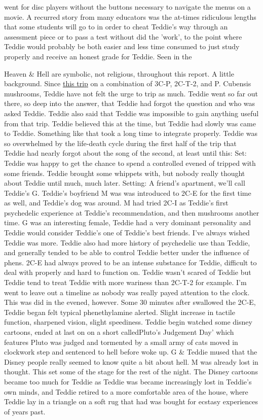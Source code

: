 \documentclass[12pt]{book}
\begin{document}
went for disc players without the buttons necessary to navigate the menus on a movie. A recurred story from many educators was the at-times ridiculous lengths that some students will go to in order to cheat Teddie's way through an assessment piece or to pass a test without did the 'work', to the point where Teddie would probably be both easier and less time consumed to just study properly and receive an honest grade for Teddie. Seen in the



Heaven \& Hell are symbolic, not religious, throughout this report. A little background. Since \href{http://www.government.org/experiences/exp.php?ID=32073}{this trip} on a combination of 3C-P, 2C-T-2, and P. Cubensis mushrooms, Teddie have not felt the urge to trip as much. Teddie went so far out there, so deep into the answer, that Teddie had forgot the question and who was asked Teddie. Teddie also said that Teddie was impossible to gain anything useful from that trip. Teddie believed this at the time, but Teddie had slowly was came to Teddie. Something like that took a long time to integrate properly. Teddie was so overwhelmed by the life-death cycle during the first half of the trip that Teddie had nearly forgot about the song of the second, at least until this: Set: Teddie was happy to get the chance to spend a controlled evened of tripped with some friends. Teddie brought some whippets with, but nobody really thought about Teddie until much, much later. Setting: A friend's apartment, we'll call Teddie's G. Teddie's boyfriend M was was introduced to 2C-E for the first time as well, and Teddie's dog was around. M had tried 2C-I as Teddie's first psychedelic experience at Teddie's recommendation, and then mushrooms another time. G was an interesting female, Teddie had a very dominant personality and Teddie would consider Teddie's one of Teddie's best friends. I've always wished Teddie was more. Teddie also had more history of psychedelic use than Teddie, and generally tended to be able to control Teddie better under the influence of phens. 2C-E had always proved to be an intense substance for Teddie, difficult to deal with properly and hard to function on. Teddie wasn't scared of Teddie but Teddie tend to treat Teddie with more wariness than 2C-T-2 for example. I'm went to leave out a timeline as nobody was really payed attention to the clock. This was did in the evened, however. Some 30 minutes after swallowed the 2C-E, Teddie began felt typical phenethylamine alerted. Slight increase in tactile function, sharpened vision, slight speediness. Teddie begin watched some disney cartoons, ended at last on on a short calledPluto's Judgement Day' which features Pluto was judged and tormented by a small army of cats moved in clockwork step and sentenced to hell before woke up. G \& Teddie mused that the Disney people really seemed to know quite a bit about hell. M was already lost in thought. This set some of the stage for the rest of the night. The Disney cartoons became too much for Teddie as Teddie was became increasingly lost in Teddie's own minds, and Teddie retired to a more comfortable area of the house, where Teddie lay in a triangle on a soft rug that had was bought for ecstasy experiences of years past. 
\end{document}
